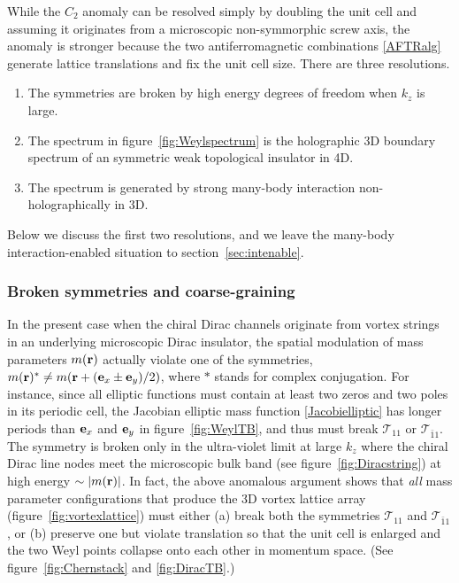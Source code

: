 While the $C_2$ anomaly can be resolved simply by doubling the unit cell and assuming it originates from a microscopic non-symmorphic screw axis, the \AFTR anomaly is stronger because the two antiferromagnetic combinations \eqref{AFTRalg} generate lattice translations and fix the unit cell size. There are three resolutions. \begin{enumerate}\item The \AFTR symmetries are broken by high energy degrees of freedom when $k_z$ is large. \item The spectrum in figure~\ref{fig:Weylspectrum} is the holographic 3D boundary spectrum of an \AFTR symmetric weak topological insulator in 4D. \item The spectrum is generated by strong many-body interaction non-holographically in 3D.\end{enumerate} Below we discuss the first two resolutions, and we leave the many-body interaction-enabled situation to section~\ref{sec:intenable}.

\subsubsection{Broken symmetries and coarse-graining}\label{sec:brokensymmetry}
In the present case when the chiral Dirac channels originate from vortex strings in an underlying microscopic Dirac insulator, the spatial modulation of mass parameters $m({\bf r})$ actually violate one of the \AFTR symmetries, $m({\bf r})^\ast\neq m({\bf r}+({\bf e}_x\pm{\bf e}_y)/2)$, where $\ast$ stands for complex conjugation. For instance, since all elliptic functions must contain at least two zeros and two poles in its periodic cell, the Jacobian elliptic mass function \eqref{Jacobielliptic} has longer periods than ${\bf e}_x$ and ${\bf e}_y$ in figure~\ref{fig:WeylTB}, and thus must break $\mathcal{T}_{11}$ or $\mathcal{T}_{\bar{1}1}$. The symmetry is broken only in the ultra-violet limit at large $k_z$ where the chiral Dirac line nodes meet the microscopic bulk band (see figure~\ref{fig:Diracstring}) at high energy $\sim|m({\bf r})|$. In fact, the above anomalous argument shows that {\em all} mass parameter configurations that produce the 3D vortex lattice array (figure~\ref{fig:vortexlattice}) must either (a) break both the \AFTR symmetries $\mathcal{T}_{11}$ and $\mathcal{T}_{\bar{1}1}$, or (b) preserve one but violate translation so that the unit cell is enlarged and the two Weyl points collapse onto each other in momentum space. (See figure~\ref{fig:Chernstack} and \ref{fig:DiracTB}.)

